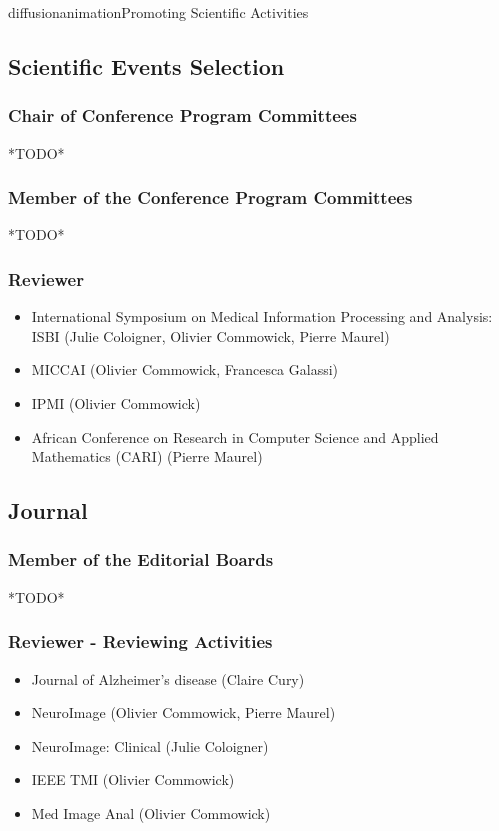 \documentclass{ra2018}
\begin{document}
\begin{module}{diffusion}{animation}{Promoting Scientific Activities}
\subsection {Scientific Events Selection}
    \subsubsection{Chair of Conference Program Committees}
    *TODO*
    \subsubsection{Member of the Conference Program Committees}
    *TODO*
    \subsubsection{Reviewer}
    \begin{itemize}
        \item International Symposium on Medical Information Processing and Analysis: ISBI (Julie Coloigner, Olivier Commowick, Pierre Maurel)
        \item MICCAI (Olivier Commowick, Francesca Galassi)
        \item IPMI (Olivier Commowick)
        \item African Conference on Research in Computer Science and Applied Mathematics (CARI) (Pierre Maurel)
    \end{itemize}   
\subsection{Journal}
    \subsubsection{Member of the Editorial Boards}
    *TODO*
    \subsubsection{Reviewer - Reviewing Activities}
    \begin{itemize}
        \item Journal of Alzheimer's disease (Claire Cury)
        \item NeuroImage (Olivier Commowick, Pierre Maurel)
        \item NeuroImage: Clinical (Julie Coloigner)
        \item IEEE TMI (Olivier Commowick)
        \item Med Image Anal (Olivier Commowick)
    \end{itemize}    

\end{module}
\end{document}
